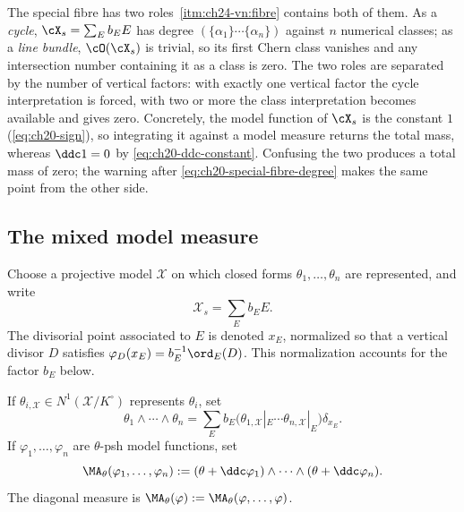 \begin{warning}{The special fibre has two roles}
\label{warn:ch24-special-fibre-roles}
\,\cref{itm:ch24-vn:fibre} contains both of
them.  As a \emph{cycle}, $\cX_s=\sum_Eb_EE$ has degree
$(\{\alpha_1\}\cdots\{\alpha_n\})$ against $n$ numerical classes; as a
\emph{line bundle}, $\cO(\cX_s)$ is trivial, so its first Chern class
vanishes and any intersection number containing it as a class is zero.  The
two roles are separated by the number of vertical factors: with exactly one
vertical factor the cycle interpretation is forced, with two or more the
class interpretation becomes available and gives zero.  Concretely, the
model function of $\cX_s$ is the constant $1$
(\eqref{eq:ch20-sign}), so integrating it against a model measure returns the
total mass, whereas $\ddc1=0$ by \eqref{eq:ch20-ddc-constant}.  Confusing
the two produces a total mass of zero; the warning after
\eqref{eq:ch20-special-fibre-degree} makes the same point from the other
side.
\end{warning}

\subsection{The mixed model measure}
\label{sec:ch24-mixed-model}

Choose a projective model $\mathcal X$ on which closed forms
$\theta_1,\ldots,\theta_n$ are represented, and write
\[
                    \mathcal X_s=\sum_E b_EE.
\]
The divisorial point associated to $E$ is denoted $x_E$, normalized so
that a vertical divisor $D$ satisfies
$\varphi_D(x_E)=b_E^{-1}\ord_E(D)$. This normalization accounts for the
factor $b_E$ below.

\begin{definition}\label{def:mixed-model-measure}
If $\theta_{i,\mathcal X}\in N^1(\mathcal X/K^\circ)$ represents
$\theta_i$, set
\begin{equation}
\label{eq:model-mixed-measure}
 \theta_1\wedge\cdots\wedge\theta_n
 =\sum_E b_E
   \bigl(\theta_{1,\mathcal X}|_E\cdots
         \theta_{n,\mathcal X}|_E\bigr)\delta_{x_E}.
\end{equation}
If $\varphi_1,\ldots,\varphi_n$ are $\theta$-psh model functions, set
\[
 \MA_\theta(\varphi_1,\ldots,\varphi_n)
 :=(\theta+\ddc\varphi_1)\wedge\cdots\wedge
    (\theta+\ddc\varphi_n).
\]
The diagonal measure is
$\MA_\theta(\varphi):=\MA_\theta(\varphi,\ldots,\varphi)$.
\end{definition}


